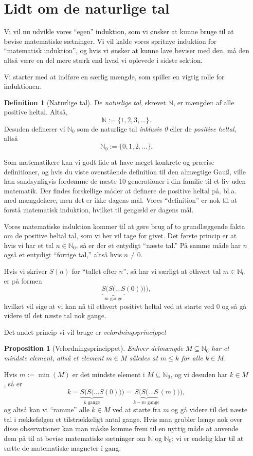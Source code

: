 \documentclass[a4paper, 12pt]{article}
\numberwithin{equation}{section}
\theoremstyle{plain}
\newtheorem{proposition}[saetning]{Proposition}
\theoremstyle{definition}
\newtheorem{definition}[saetning]{Definition}
\newcommand{\N}{\mathbb{N}}
\begin{document}
\section{Lidt om de naturlige tal}
Vi vil nu udvikle vores ``egen'' induktion, som vi ønsker at kunne bruge til at bevise matematiske sætninger. Vi vil kalde vores spritnye induktion for ``matematisk induktion'', og hvis vi ønsker at kunne lave beviser med den, må den altså være en del mere stærk end hvad vi oplevede i sidste sektion.

Vi starter med at indføre en særlig mængde, som spiller en vigtig rolle for induktionen.
\begin{definition}[Naturlige tal]
  De \emph{naturlige tal}, skrevet \(\N\), er mængden af alle positive heltal. Altså,
  \[
    \N:=\{1,2,3,\ldots\}.
  \]
  Desuden definerer vi \(\N_0\) som de naturlige tal \emph{inklusiv 0} eller de \emph{positive heltal}, altså
  \[
    \N_0:=\{0,1,2,\ldots\}.
    \]
\end{definition}
Som matematikere kan vi godt lide at have meget konkrete og præcise definitioner, og hvis du viste ovenstående definition til den almægtige Gau{\ss}, ville han sandsynligvis fordømme de næste 10 generationer i din familie til et liv uden matematik. Der findes forskellige måder at definere de positive heltal på, bl.a. med mængdelære, men det er ikke dagens mål. Vores ``definition'' er nok til at forstå matematisk induktion, hvilket til gengæld er dagens mål.

Vores matematiske induktion kommer til at gøre brug af to grundlæggende fakta om de positive heltal tal, som vi her vil tage for givet. Det første princip er at hvis vi har et  tal \(n\in\N_0\), så er der et entydigt ``næste tal.'' På samme måde har \(n\) også et entydigt ``forrige tal,'' altså hvis \(n\neq 0\).

Hvis vi skriver \(S(n)\) for ``tallet efter \(n\)'', så har vi særligt at ethvert tal \(m\in\N_0\) er på formen
\[
  \underbrace{S(S(\ldots S}_{m\text{ gange}}(0)))),
\]
hvilket vil sige at vi kan nå til ethvert positivt heltal ved at starte ved 0 og så gå videre til det næste tal nok gange.

Det andet princip vi vil bruge er \emph{velordningsprincippet}
\begin{proposition}[Velordningsprincippet]
  Enhver delmængde \(M\subseteq \N_0\) har et \emph{mindste element}, altså et element \(m\in M\) således at \(m\le k\) for alle \(k\in M\).
\end{proposition}
Hvis \(m:=\min(M)\) er det mindste element i \(M\subseteq \N_0\), og vi desuden har \(k\in M\), så er
\[
  k=\underbrace{S(S(\ldots S}_{k\text{ gange}}(0)))=\underbrace{S(S(\ldots S}_{k-m\text{ gange}}(m))),
  \]
  og altså kan vi ``ramme'' alle \(k\in M\) ved at starte fra \(m\) og gå videre til det næste tal i rækkefølgen et tilstrækkeligt antal gange. Hvis man grubler længe nok over disse observationer kan man måske komme frem til en nyttig måde at anvende dem på til at bevise matematiske sætninger om \(\N\) og \(\N_0\); vi er endelig klar til at sætte de matematiske magneter i gang.
\end{document}
